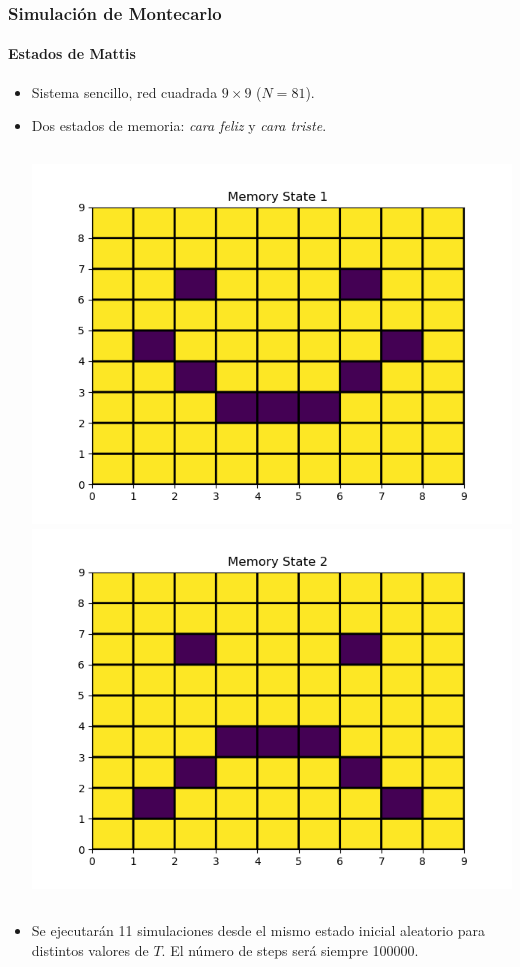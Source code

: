 \documentclass[11pt]{beamer}
\begin{document}
\begin{frame}
\frametitle{Simulación de Montecarlo}
\framesubtitle{Estados de Mattis}
\begin{itemize}
\item Sistema sencillo, red cuadrada $9 \times 9$ ($N = 81$).
\item Dos estados de memoria: \textit{cara feliz} y \textit{cara triste}.
\begin{columns}
\includegraphics[scale = 0.3]{state_9x9_1.png}
\includegraphics[scale = 0.3]{state_9x9_2.png}
\end{columns}
\item Se ejecutarán 11 simulaciones desde el mismo estado inicial aleatorio para distintos valores de $T$. El número de steps será siempre 100000.

\end{itemize}   
\end{frame}
\end{document}
